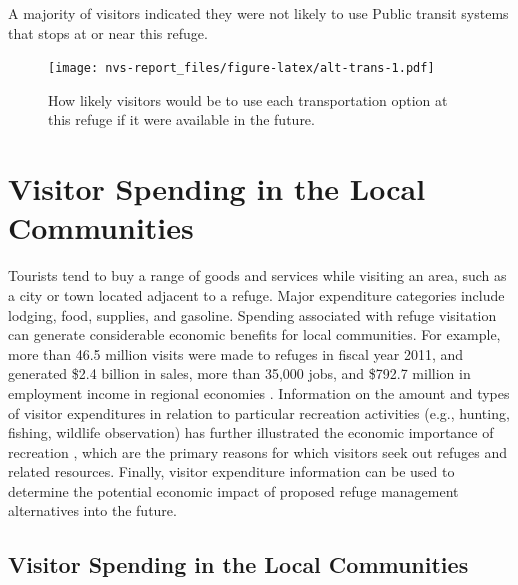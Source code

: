 \documentclass[]{book}
\let\BeginKnitrBlock\begin \let\EndKnitrBlock\end
\begin{document}
A majority of visitors indicated they were not likely to use Public
transit systems that stops at or near this refuge.

\begin{figure}
\centering
\texttt{[image: nvs-report\_files/figure-latex/alt-trans-1.pdf]}
\caption{\label{fig:alt-trans}How likely visitors would be to use each
transportation option at this refuge if it were available in the
future.}
\end{figure}

\chapter{Visitor Spending in the Local Communities}\label{econ}

\BeginKnitrBlock{heading4}
Tourists tend to buy a range of goods and services while visiting an
area, such as a city or town located adjacent to a refuge. Major
expenditure categories include lodging, food, supplies, and gasoline.
Spending associated with refuge visitation can generate considerable
economic benefits for local communities. For example, more than 46.5
million visits were made to refuges in fiscal year 2011, and generated
\$2.4 billion in sales, more than 35,000 jobs, and \$792.7 million in
employment income in regional economies \citep{carver2013}. Information
on the amount and types of visitor expenditures in relation to
particular recreation activities (e.g., hunting, fishing, wildlife
observation) has further illustrated the economic importance of
recreation \citep{USFWS2018}, which are the primary reasons for which
visitors seek out refuges and related resources. Finally, visitor
expenditure information can be used to determine the potential economic
impact of proposed refuge management alternatives into the future.
\EndKnitrBlock{heading4}

\section*{Visitor Spending in the Local
Communities}\label{visitor-spending-in-the-local-communities}
\end{document}
